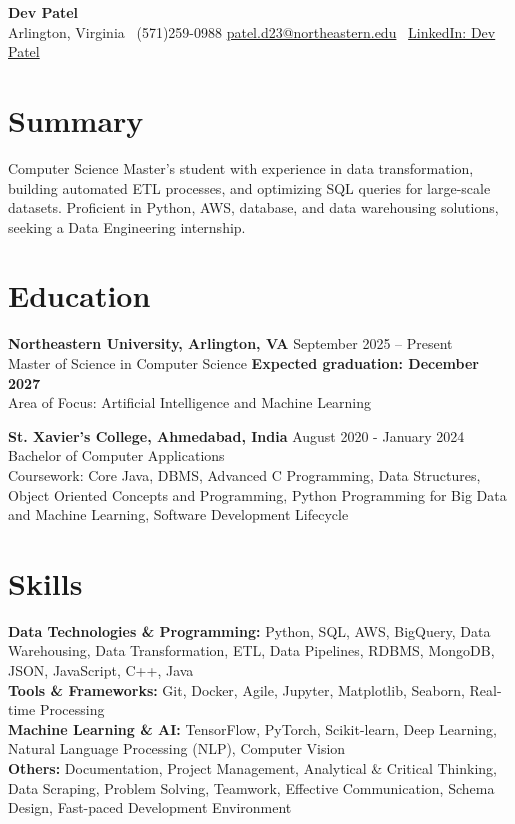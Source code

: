 \documentclass[a4paper,10pt]{article}
\begin{document}
\begin{center}
\vspace{-3mm}
    \fontsize{16}{18}\selectfont \textbf{Dev Patel} \\
    \vspace{0mm}
    \normalsize Arlington, Virginia \textbar\ (571)259-0988  \textbar       \href{mailto:patel.d23@northeastern.edu}{patel.d23@northeastern.edu} \textbar\ \href{https://www.linkedin.com/in/devxpatel//}{LinkedIn: Dev Patel} \\
\end{center}



\section*{Summary}
Computer Science Master's student with experience in data transformation, building automated ETL processes, and optimizing SQL queries for large-scale datasets. Proficient in Python, AWS, database, and data warehousing solutions, seeking a Data Engineering internship.
 
\vspace{ 0 mm}
\section*{Education}
\textbf{Northeastern University, Arlington, VA} \hfill September 2025 -- Present\\
Master of Science in Computer Science \hfill \textbf{Expected graduation: December 2027} \\
Area of Focus: Artificial Intelligence and Machine Learning

\vspace{1 mm} %
\textbf{St. Xavier's College, Ahmedabad, India} \hfill August 2020 - January 2024 \\
Bachelor of Computer Applications\\
Coursework: Core Java, DBMS, Advanced C Programming, Data Structures, Object Oriented Concepts and Programming, Python Programming for Big Data and Machine Learning, Software Development Lifecycle

\section*{Skills}
\textbf{Data Technologies \& Programming: } Python, SQL, AWS, BigQuery, Data Warehousing, Data Transformation, ETL, Data Pipelines, RDBMS, MongoDB, JSON, JavaScript, C++, Java \\
\textbf{Tools \& Frameworks:} Git, Docker, Agile, Jupyter, Matplotlib, Seaborn, Real-time Processing \\
\textbf{Machine Learning \& AI: } TensorFlow, PyTorch, Scikit-learn, Deep Learning, Natural Language Processing (NLP), Computer Vision \\
\textbf{Others: } Documentation, Project Management, Analytical \& Critical Thinking, Data Scraping, Problem Solving, Teamwork, Effective Communication, Schema Design, Fast-paced Development Environment \\
\end{document}
